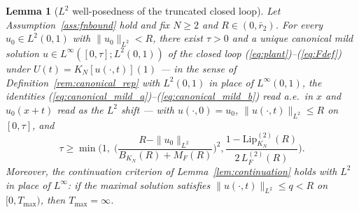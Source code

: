 \documentclass[10pt,a4paper]{amsart}
\newtheorem{lemma}{Lemma}
\newcommand{\Linf}{L^\infty}
\newcommand{\Ltwo}{L^2}
\newcommand{\LipKn}{\mathrm{Lip}_{K_N}}
\begin{document}
\begin{lemma}[$\Ltwo$ well-posedness of the truncated closed loop]\label{lem:wellposedL2}
Let Assumption~\ref{ass:fnbound} hold and fix $N \ge 2$ and $R \in (0, \bar r_2)$. For every $u_0 \in \Ltwo(0,1)$ with $\|u_0\|_{\Ltwo} < R$, there exist $\tau > 0$ and a unique canonical mild solution $u \in \Linf([0,\tau]; \Ltwo(0,1))$ of the closed loop (\ref{eq:plant})--(\ref{eq:Fdef}) under $U(t) = K_N[u(\cdot,t)](1)$ --- in the sense of Definition~\ref{rem:canonical_rep} with $\Ltwo(0,1)$ in place of $\Linf(0,1)$, the identities (\ref{eq:canonical_mild_a})--(\ref{eq:canonical_mild_b}) read a.e.\ in $x$ and $u_0(x+t)$ read as the $\Ltwo$ shift --- with $u(\cdot,0) = u_0$, $\|u(\cdot,t)\|_{\Ltwo} \le R$ on $[0,\tau]$, and
\begin{equation}
\tau \ge \min\!\Biggl(1,\; \biggl(\frac{R - \|u_0\|_{\Ltwo}}{B_{K_N}(R) + M_F(R)}\biggr)^{\!2}, \frac{1 - \LipKn^{(2)}(R)}{2\, L_F^{(2)}(R)}\Biggr).
\label{eq:tau_lb_L2}
\end{equation}
Moreover, the continuation criterion of Lemma~\ref{lem:continuation} holds with $\Ltwo$ in place of $\Linf$: if the maximal solution satisfies $\|u(\cdot,t)\|_{\Ltwo} \le q < R$ on $[0, T_{\max})$, then $T_{\max} = \infty$.
\end{lemma}
\end{document}
